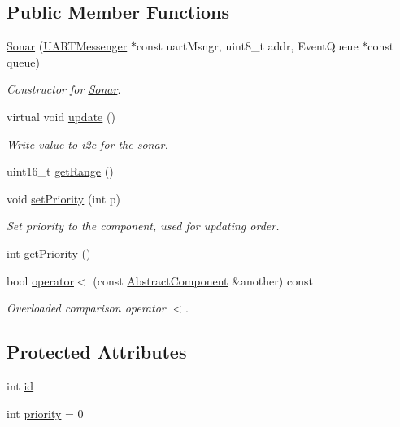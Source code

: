 \subsection*{Public Member Functions}
\begin{DoxyCompactItemize}
\item 
\hyperlink{class_sonar_a8199e2b1d48626cc0404708063d7fe42}{Sonar} (\hyperlink{class_u_a_r_t_messenger}{U\+A\+R\+T\+Messenger} $\ast$const uart\+Msngr, uint8\+\_\+t addr, Event\+Queue $\ast$const \hyperlink{class_sonar_af0431d160853c8313eba0fd0e1ce8346}{queue})
\begin{DoxyCompactList}\small\item\em Constructor for \hyperlink{class_sonar}{Sonar}. \end{DoxyCompactList}\item 
virtual void \hyperlink{class_sonar_aaf10dd734528b86b4dea3ab35c4ee4f4}{update} ()
\begin{DoxyCompactList}\small\item\em Write value to i2c for the sonar. \end{DoxyCompactList}\item 
uint16\+\_\+t \hyperlink{class_sonar_a7a641bcfac1967fbc42eea2ab70886dc}{get\+Range} ()
\item 
void \hyperlink{class_abstract_component_a58a59a9ea6c3b4c86fb3bf98ff1eaaef}{set\+Priority} (int p)
\begin{DoxyCompactList}\small\item\em Set priority to the component, used for updating order. \end{DoxyCompactList}\item 
int \hyperlink{class_abstract_component_ac0b440d1d642ff1292ec3c544d75a8f1}{get\+Priority} ()
\item 
bool \hyperlink{class_abstract_component_a0c2e458144111c5f599c66f168516abc}{operator$<$} (const \hyperlink{class_abstract_component}{Abstract\+Component} \&another) const
\begin{DoxyCompactList}\small\item\em Overloaded comparison operator \textquotesingle{}$<$\textquotesingle{}. \end{DoxyCompactList}\end{DoxyCompactItemize}
\subsection*{Protected Attributes}
\begin{DoxyCompactItemize}
\item 
int \hyperlink{class_abstract_component_a9c9c548149681b1a1dd935e66ed5dd11}{id}
\item 
int \hyperlink{class_abstract_component_aff57dfa5f31be093a06b55560e33fb95}{priority} = 0
\end{DoxyCompactItemize}
